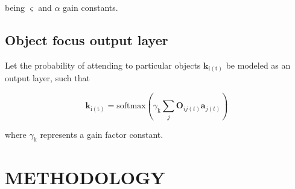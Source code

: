 \documentclass[letterpaper, 10 pt, conference]{ieeeconf}  %
\begin{document}
	\noindent being $\varsigma$ and $\alpha$ gain constants.
	
	\subsection{Object focus output layer}
	
	Let the probability of attending to particular objects $\mathbf{k}_\mathrm{i(t)}$ be modeled as an output layer, such that
	
	\begin{equation}
	\mathbf{k}_\mathrm{i(t)} = \mathrm{softmax}\left(\gamma_{\mathrm{k}}\sum_{j}^{} \mathbf{O}_{ij(t)}\mathbf{a}_{j(t)}\right)
	\label{eq:out}
	\end{equation}
	
	\noindent where $\gamma_{\mathrm{k}}$ represents a gain factor constant.
	


	

%	
%			
%	
	
	\section{METHODOLOGY}
	\label{sec:methodology}
\end{document}
